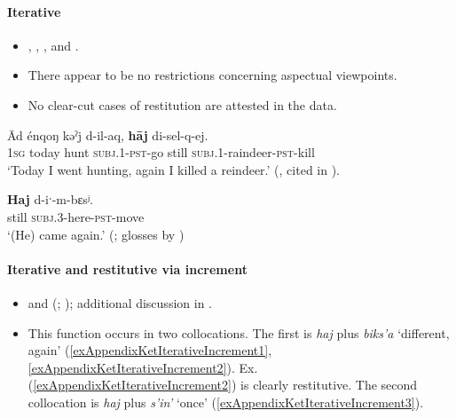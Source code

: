 \paragraph{Iterative}
\label{appendixKetIterative}
\begin{itemize}
	\item \textcite[45]{Donner1955}, \textcite[311]{Georg2007}, \textcite[177]{KotorovaNefedov2015}, \textcite[96]{Nefedov2015} and \textcite[292]{Werner2002}.
	\item There appear to be no restrictions concerning aspectual viewpoints.
	\item No clear-cut cases of restitution are attested in the data.
\end{itemize}
\begin{exe}
	\ex 
	\gll Ād énqoŋ kəˀj d-il-aq, \textbf{hāj} di-sel-q-ej.\\
	1\textsc{sg} today hunt \textsc{subj}.1-\textsc{pst}-go still \textsc{subj}.1-raindeer-\textsc{pst}-kill\\
	\glt \lq Today I went hunting, again I killed a reindeer.\rq{ }(\cite[113]{Krejnovic1969}, cited in \cite[230]{Georg2007}).

	\ex\label{appendixKetIterative2}
	\gll  \textbf{Haj} d-iˑ-m-bɛsʲ.\\
	still \textsc{subj}.3-here-\textsc{pst}-move\\
	\glt \lq (He) came again.' (\cite[292]{Werner2002}; glosses by \cite[96]{Nefedov2015})
\end{exe}

\paragraph{Iterative and restitutive via increment}
\label{appendixKetIterativeIncrement}
\begin{itemize}
\item \textcite[177]{KotorovaNefedov2015} and \citeauthor{Werner1997} (\citeyear[145, 381]{Werner1997}; \citeyear[292]{Werner2002}); additional discussion in \textcite[306]{vanBaar1997}.
\item This function occurs in two collocations. The first is \textit{haj} plus \textit{biks'a} \lq different, again' (\ref{exAppendixKetIterativeIncrement1}, \ref{exAppendixKetIterativeIncrement2}). Ex. (\ref{exAppendixKetIterativeIncrement2}) is clearly restitutive. The second collocation is \textit{haj} plus \textit{s'in'} \lq once\rq{ }(\ref{exAppendixKetIterativeIncrement3}).
\end{itemize}

